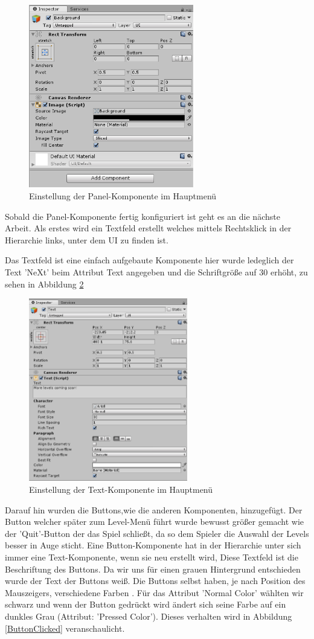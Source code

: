 \begin{figure}[H]
	\centering
	\includegraphics[height=8cm]{images/PanelSetup.png}
	\caption{Einstellung der Panel-Komponente im Hauptmenü}
	\label{PanelSetup}
\end{figure}

Sobald die Panel-Komponente fertig konfiguriert ist geht es an die nächste Arbeit. Als erstes wird ein Textfeld erstellt welches mittels Rechtsklick in der Hierarchie links, unter dem UI zu finden ist.

Das Textfeld ist eine einfach aufgebaute Komponente hier wurde ledeglich der Text 'NeXt' beim Attribut Text angegeben und die Schriftgröße auf 30 erhöht, zu sehen in Abbildung \ref{TextSetupMainMenu}
\begin{figure}[H]
	\centering
	\includegraphics[height=8cm]{images/MainMenuTextSetup.png}
	\caption{Einstellung der Text-Komponente im Hauptmenü}
	\label{TextSetupMainMenu}
\end{figure}
 Darauf hin wurden die Buttons,wie die anderen Komponenten, hinzugefügt. Der Button welcher später zum Level-Menü führt wurde bewusst größer gemacht wie der 'Quit'-Button der das Spiel schließt, da so dem Spieler die Auswahl der Levels besser in Auge sticht. Eine Button-Komponente hat in der Hierarchie unter sich immer eine Text-Komponente, wenn sie neu erstellt wird, Diese Textfeld ist die Beschriftung des Buttons. Da wir uns für einen grauen Hintergrund entschieden wurde der Text der Buttons weiß. Die Buttons selbst haben, je nach Position des Mauszeigers, verschiedene Farben . Für das Attribut 'Normal Color' wählten wir schwarz und wenn der Button gedrückt wird ändert sich seine Farbe auf ein dunkles Grau (Attribut: 'Pressed Color'). Dieses verhalten wird in Abbildung \ref{ButtonClicked} veranschaulicht.
 
